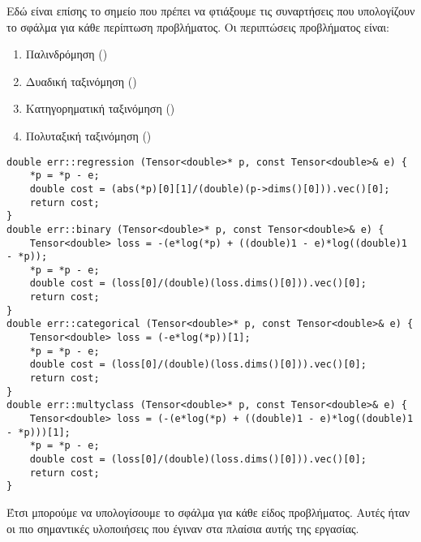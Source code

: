 Εδώ είναι επίσης το σημείο που πρέπει να φτιάξουμε τις συναρτήσεις που υπολογίζουν το σφάλμα για κάθε περίπτωση προβλήματος. Οι περιπτώσεις προβλήματος είναι:
\begin{enumerate}
    \item Παλινδρόμηση ()
    \item Δυαδική ταξινόμηση ()
    \item Κατηγορηματική ταξινόμηση ()
    \item Πολυταξική ταξινόμηση ()
\end{enumerate}
\begin{otherlanguage}{english}
\begin{lstlisting}[style=cppstyle,caption= Network layer in cpp file]
double err::regression (Tensor<double>* p, const Tensor<double>& e) {
    *p = *p - e;
    double cost = (abs(*p)[0][1]/(double)(p->dims()[0])).vec()[0];
    return cost;
}
double err::binary (Tensor<double>* p, const Tensor<double>& e) {
    Tensor<double> loss = -(e*log(*p) + ((double)1 - e)*log((double)1 - *p));
    *p = *p - e;
    double cost = (loss[0]/(double)(loss.dims()[0])).vec()[0];
    return cost;
}
double err::categorical (Tensor<double>* p, const Tensor<double>& e) {
    Tensor<double> loss = (-e*log(*p))[1];
    *p = *p - e;
    double cost = (loss[0]/(double)(loss.dims()[0])).vec()[0];
    return cost;
}
double err::multyclass (Tensor<double>* p, const Tensor<double>& e) {
    Tensor<double> loss = (-(e*log(*p) + ((double)1 - e)*log((double)1 - *p)))[1];
    *p = *p - e;
    double cost = (loss[0]/(double)(loss.dims()[0])).vec()[0];
    return cost;
}
\end{lstlisting}
\end{otherlanguage}
Έτσι μπορούμε να υπολογίσουμε το σφάλμα για κάθε είδος προβλήματος. Αυτές ήταν οι πιο σημαντικές υλοποιήσεις που έγιναν στα πλαίσια αυτής της εργασίας.